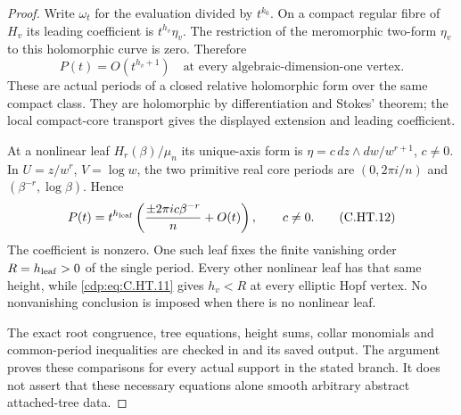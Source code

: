 \begin{proof}
Write $\omega_t$ for the evaluation divided by $t^{k_0}$.
On a compact regular fibre of $H_v$ its leading coefficient is
$t^{h_v}\eta_v$. The restriction of the meromorphic two-form
$\eta_v$ to this holomorphic curve is zero. Therefore
\[
                     P(t)=O(t^{h_v+1})
       \quad\text{at every algebraic-dimension-one vertex}.
                                                        \tag{C.HT.11}\label{cdp:eq:C.HT.11}
\]
These are actual periods of a closed relative holomorphic form
over the same compact class. They are holomorphic by
differentiation and Stokes' theorem; the local compact-core
transport gives the displayed extension and leading coefficient.

At a nonlinear leaf
$H_r(\beta)/\mu_n$ its unique-axis form is
$\eta=c\,dz\wedge dw/w^{r+1}$, $c\ne0$. In
$U=z/w^r$, $V=\log w$, the two primitive real core periods are
$(0,2\pi i/n)$ and $(\beta^{-r},\log\beta)$. Hence
\[
 P(t)=t^{h_{\rm leaf}}
       \left(\frac{\pm2\pi i c\beta^{-r}}{n}+O(t)\right),
                    \qquad c\ne0.                     \tag{C.HT.12}\label{cdp:eq:C.HT.12}
\]
The coefficient is nonzero. One such leaf fixes the finite
vanishing order $R=h_{\rm leaf}>0$ of the single period.
Every other nonlinear leaf has that same height, while
\eqref{cdp:eq:C.HT.11} gives $h_v<R$ at every elliptic Hopf vertex.
No nonvanishing conclusion is imposed when there is no nonlinear
leaf.

The exact root congruence, tree equations, height sums, collar
monomials and common-period inequalities are checked in
 and its saved output. The
argument proves these comparisons for every actual support in
the stated branch. It does not assert that these necessary
equations alone smooth arbitrary abstract attached-tree data.
\end{proof}


